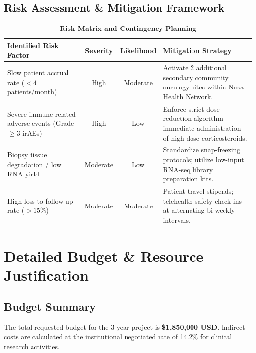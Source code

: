 \documentclass[10pt,a4paper]{article}
\begin{document}
\subsection{Risk Assessment \& Mitigation Framework}

\begin{table}[htbp]
\caption{\textbf{Risk Matrix and Contingency Planning}}
\vspace{-0.4em}
\small
\begin{tabularx}{\textwidth}{X c c X}
\toprule
\rowcolor{HeaderBg} \textbf{Identified Risk Factor} & \textbf{Severity} & \textbf{Likelihood} & \textbf{Mitigation Strategy} \\
\midrule
Slow patient accrual rate ($<4$ patients/month) & High & Moderate & Activate 2 additional secondary community oncology sites within Nexa Health Network. \\
Severe immune-related adverse events (Grade $\ge 3$ irAEs) & High & Low & Enforce strict dose-reduction algorithm; immediate administration of high-dose corticosteroids. \\
Biopsy tissue degradation / low RNA yield & Moderate & Low & Standardize snap-freezing protocols; utilize low-input RNA-seq library preparation kits. \\
High loss-to-follow-up rate ($>15\%$) & Moderate & Moderate & Patient travel stipends; telehealth safety check-ins at alternating bi-weekly intervals. \\
\bottomrule
\end{tabularx}
\end{table}

\section{Detailed Budget \& Resource Justification}

\subsection{Budget Summary}
The total requested budget for the 3-year project is \textbf{\$1,850,000 USD}. Indirect costs are calculated at the institutional negotiated rate of 14.2\% for clinical research activities.
\end{document}
